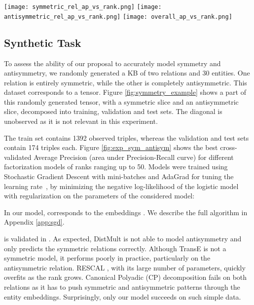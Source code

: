 \documentclass{article}
\begin{document}
\begin{figure*}{{\extracolsep{8pt}}}\centering
	\texttt{[image: symmetric\_rel\_ap\_vs\_rank.png]}
	\texttt{[image: antisymmetric\_rel\_ap\_vs\_rank.png]} 
	\texttt{[image: overall\_ap\_vs\_rank.png]}
\caption{Average Precision (AP) for each factorization rank ranging from 1 to 50 for different state of the art models on the combined symmetry and antisymmetry experiment. Top-left: AP for the symmetric relation only. Top-right: AP for the antisymmetric relation only. Bottom: Overall AP.}
	\label{fig:exp_sym_antisym}
\end{figure*}

\subsection{Synthetic Task}

To assess the ability of our proposal to accurately model symmetry and antisymmetry, we randomly generated a KB of two relations and 30 entities. One relation is entirely symmetric, while the other is completely antisymmetric. This dataset corresponds to a  tensor. Figure \ref{fig:symmetry_example} shows a part of this randomly generated tensor, with a symmetric slice and an antisymmetric slice, decomposed into training, validation and test sets. The diagonal is unobserved as it is not relevant in this experiment.

The train set contains 1392 observed triples, whereas the validation and test sets contain 174 triples each. Figure \ref{fig:exp_sym_antisym} shows the best cross-validated Average Precision (area under Precision-Recall curve) for different factorization models of ranks ranging up to 50. Models were trained using Stochastic Gradient Descent with mini-batches and AdaGrad for tuning the learning rate~\cite{duchi2011adaptive}, by minimizing the negative log-likelihood of the logistic model with  regularization on the parameters  of the considered model:

In our model,  corresponds to the embeddings .
We describe the full algorithm in Appendix \ref{app:sgd}.

 is validated in    . As expected, DistMult \cite{Yang2015} is not able to model antisymmetry and only predicts the symmetric relations correctly. Although TransE \cite{bordes2013translating} is not a symmetric model, it performs poorly in practice, particularly on the antisymmetric relation. 
RESCAL \cite{Nickel2011}, with its large number of parameters, quickly overfits as the rank grows. Canonical Polyadic (CP) decomposition \cite{hitchcock-sum-1927} fails on both relations as it has to push symmetric and antisymmetric patterns through the entity embeddings. Surprisingly, only our model succeeds on such simple data.
\end{document}
